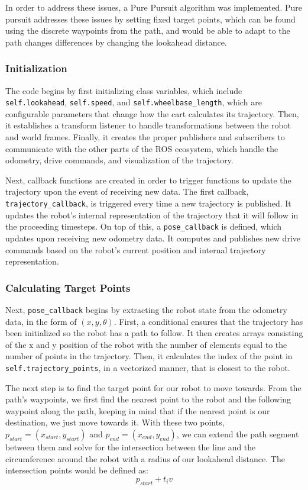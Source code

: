 \documentclass{article}
\begin{document}
In order to address these issues, a Pure Pursuit algorithm was implemented. Pure pursuit addresses these issues by setting fixed target points, which can be found using the discrete waypoints from the path, and would be able to adapt to the path changes differences by changing the lookahead distance.

\subsubsection{Initialization}
The code begins by first initializing class variables, which include \texttt{self.lookahead}, \texttt{self.speed}, and \texttt{self.wheelbase\_length}, which are configurable parameters that change how the cart calculates its trajectory. Then, it establishes a transform listener to handle transformations between the robot and world frames. Finally, it creates the proper publishers and subscribers to communicate with the other parts of the ROS ecosystem, which handle the odometry, drive commands, and visualization of the trajectory.

Next, callback functions are created in order to trigger functions to update the trajectory upon the event of receiving new data. The first callback, \texttt{trajectory\_callback}, is triggered every time a new trajectory is published. It updates the robot's internal representation of the trajectory that it will follow in the proceeding timesteps. On top of this, a \texttt{pose\_callback} is defined, which updates upon receiving new odometry data. It computes and publishes new drive commands based on the robot's current position and internal trajectory representation.

\subsubsection{Calculating Target Points}
Next, \texttt{pose\_callback} begins by extracting the robot state from the odometry data, in the form of $(x, y, \theta)$. First, a conditional ensures that the trajectory has been initialized so the robot has a path to follow. It then creates arrays consisting of the x and y position of the robot with the number of elements equal to the number of points in the trajectory. Then, it calculates the index of the point in \texttt{self.trajectory\_points}, in a vectorized manner, that is closest to the robot. 

The next step is to find the target point for our robot to move towards. From the path's waypoints, we first find the nearest point to the robot and the following waypoint along the path, keeping in mind that if the nearest point is our destination, we just move towards it. With these two points, $p_{start} = (x_{start}, y_{start})$ and $p_{end} = (x_{end}, y_{end})$, we can extend the path segment between them and solve for the intersection between the line and the circumference around the robot with a radius of our lookahead distance. The intersection points would be defined as:
$$p_{start} + t_i v$$
\end{document}
